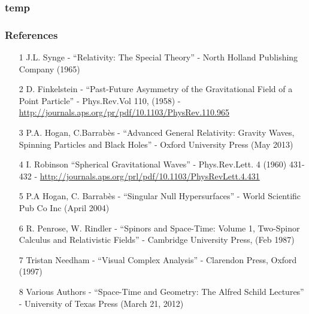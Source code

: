 \documentclass[10pt,a4paper]{beamer}
\begin{document}
\begin{frame}
\frametitle{temp}

\end{frame}
















\begin{frame}
\frametitle{References}
\begin{itemize}
\item[1]{ J.L. Synge - ``Relativity: The Special Theory'' - North Holland Publishing Company (1965)}
\item[2]{ D. Finkelstein - ``Past-Future Asymmetry of the Gravitational Field of a Point Particle'' - Phys.Rev.Vol 110, (1958) - \url{http://journals.aps.org/pr/pdf/10.1103/PhysRev.110.965}}
\item[3]{ P.A. Hogan, C.Barrab\`es - ``Advanced General Relativity: Gravity Waves, Spinning Particles and Black Holes'' - Oxford University Press (May 2013)}
\item[4]{ I. Robinson ``Spherical Gravitational Waves'' - Phys.Rev.Lett. 4 (1960) 431-432 - \url{http://journals.aps.org/prl/pdf/10.1103/PhysRevLett.4.431}}
\item[5]{ P.A Hogan, C. Barrab\`es - ``Singular Null Hypersurfaces'' - World Scientific Pub Co Inc (April 2004)}
\item[6]{ R. Penrose, W. Rindler - ``Spinors and Space-Time: Volume 1, Two-Spinor Calculus and Relativistic Fields'' - Cambridge University Press, (Feb 1987)}
\item[7]{ Tristan Needham - ``Visual Complex Analysis'' - Clarendon Press, Oxford (1997)}
\item[8]{ Various Authors - ``Space-Time and Geometry: The Alfred Schild Lectures'' - University of Texas Press (March 21, 2012)}
\end{itemize}
\end{frame}
\end{document}
